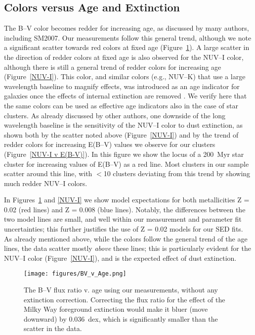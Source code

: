 \documentclass{aastex63}
\begin{document}
\subsection{Colors versus Age and Extinction}

The B--V color becomes redder for increasing age, as discussed by many authors, including SM2007. Our measurements follow this general trend, although we note a significant scatter towards red colors at fixed age (Figure~\ref{B-VAge}). A large scatter in the direction of redder colors at fixed age is also observed for the NUV--I color, although there is still a general trend of redder colors for increasing age  (Figure~\ref{NUV-I}). This color, and similar colors (e.g., NUV--K) that use a large wavelength baseline to magnify effects, was introduced as an age indicator for galaxies once the effects of internal extinction are removed \citep[e.g.,][]{Munoz+2007, Cortese+2008}. We verify here that the same colors can be used as effective age indicators also in the case of star clusters. As already discussed by other authors, one downside of the long wavelength baseline is the sensitivity of the NUV--I color to dust extinction, as shown both by the scatter noted above (Figure~\ref{NUV-I}) and by the trend of redder colors for increasing E(B--V) values we observe for our clusters (Figure~\ref{NUV-I v E(B-V)}). In this figure we show the locus of a 200~Myr  star cluster for increasing values of E(B--V) as a red line. Most clusters  in our sample scatter around this line, with $<$10 clusters deviating from this trend by showing much redder NUV--I colors. 

In Figures~\ref{B-VAge} and \ref{NUV-I} we show model expectations for both metallicities Z = 0.02 (red lines) and Z = 0.008 (blue lines). Notably, the differences between the two model lines are small, and well within our measurement and parameter fit uncertainties;  this further justifies the use of Z = 0.02 models for our SED fits. As already mentioned above, while the colors follow the general trend of the age lines, the data scatter mostly {\em above} these lines; this is particularly evident for the NUV--I color (Figure~\ref{NUV-I}), and is the expected effect of dust extinction.  

\begin{figure}
 \centering
 \texttt{[image: figures/BV\_v\_Age.png]}
    \caption{The B--V flux ratio v. age  using our measurements, without any extinction correction. Correcting the flux ratio for the effect of  the Milky Way foreground extinction would make it bluer (move downward) by 0.036~dex, which is significantly smaller than the scatter in the data.}
        \label{B-VAge}
\end{figure}
\end{document}
